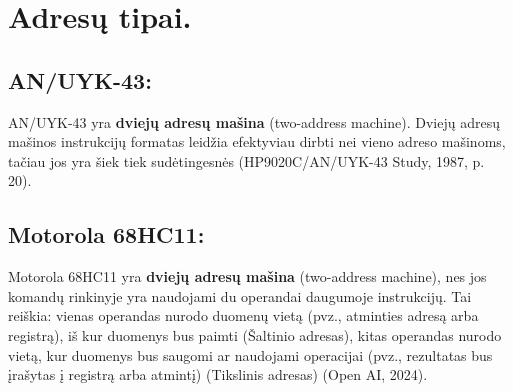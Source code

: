 \documentclass[a4paper,12pt]{article}
\begin{document}
\section{Adresų tipai.}
\subsection{AN/UYK-43:}
AN/UYK-43 yra \textbf{dviejų adresų mašina} (two-address machine). Dviejų adresų mašinos instrukcijų formatas leidžia efektyviau dirbti nei vieno adreso mašinoms, tačiau jos yra šiek tiek sudėtingesnės (HP9020C/AN/UYK-43 Study, 1987, p. 20).
\subsection{Motorola 68HC11:}
Motorola 68HC11 yra \textbf{dviejų adresų mašina} (two-address machine), nes jos komandų rinkinyje yra naudojami du operandai daugumoje instrukcijų. Tai reiškia: vienas operandas nurodo duomenų vietą (pvz., atminties adresą arba registrą), iš kur duomenys bus paimti (Šaltinio adresas), kitas operandas nurodo vietą, kur duomenys bus saugomi ar naudojami operacijai (pvz., rezultatas bus įrašytas į registrą arba atmintį) (Tikslinis adresas) (Open AI, 2024). 
\end{document}
